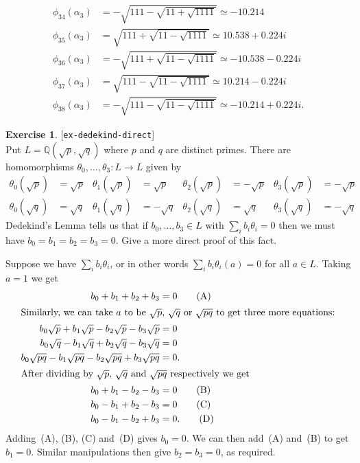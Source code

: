\documentclass{amsart}
\newcommand{\Q}         {{\mathbb{Q}}}
\newcommand{\al}        {\alpha}
\newcommand{\tht}       {\theta}
\renewcommand{\:}{\colon}
\newcommand{\lastexlabel}{}
\newcommand{\exlabel}[1]{
 \global\def\lastexlabel{#1}\label{#1}[\texttt{#1}]\ \\
}
\newcommand{\exlabel}[1]{
 \global\def\lastexlabel{#1}\label{#1}
}
\newenvironment{solution}{\SolutionInline}{\endSolutionInline}
\theoremstyle{definition}
\newtheorem{exercise}{Exercise}[section]
\renewenvironment{solution}{\SolutionAtEnd}{\endSolutionAtEnd}
\begin{document}
\begin{solution}
\begin{itemize}
\begin{align*}
    \phi_{34}(\al_3) &= -\sqrt{111-\sqrt{11+\sqrt{1111}}} \simeq -10.214 \\
    \phi_{35}(\al_3) &= \sqrt{111+\sqrt{11-\sqrt{1111}}} \simeq 10.538+0.224i \\
    \phi_{36}(\al_3) &= -\sqrt{111+\sqrt{11-\sqrt{1111}}} \simeq -10.538-0.224i \\
    \phi_{37}(\al_3) &= \sqrt{111-\sqrt{11-\sqrt{1111}}} \simeq 10.214-0.224i \\
    \phi_{38}(\al_3) &= -\sqrt{111-\sqrt{11-\sqrt{1111}}} \simeq -10.214+0.224i.
   \end{align*}
 \end{itemize}
\end{solution}

\begin{exercise}\exlabel{ex-dedekind-direct}
 Put $L=\Q(\sqrt{p},\sqrt{q})$ where $p$ and $q$ are distinct primes. 
 There are homomorphisms $\tht_0,\dotsc,\tht_3\:L\to L$ given by 
 \begin{align*}
  \tht_0(\sqrt{p}) &=  \sqrt{p} &
  \tht_1(\sqrt{p}) &=  \sqrt{p} &
  \tht_2(\sqrt{p}) &= -\sqrt{p} &
  \tht_3(\sqrt{p}) &= -\sqrt{p} \\
  \tht_0(\sqrt{q}) &=  \sqrt{q} &
  \tht_1(\sqrt{q}) &= -\sqrt{q} &
  \tht_2(\sqrt{q}) &=  \sqrt{q} &
  \tht_3(\sqrt{q}) &= -\sqrt{q}  
 \end{align*}
 Dedekind's Lemma tells us that if $b_0,\dotsc,b_3\in L$ with
 $\sum_ib_i\tht_i=0$ then we must have $b_0=b_1=b_2=b_3=0$.  Give a
 more direct proof of this fact.
\end{exercise}
\begin{solution}
 Suppose we have $\sum_ib_i\tht_i$, or in other words
 $\sum_ib_i\tht_i(a)=0$ for all $a\in L$.  Taking $a=1$ we get 
 \begin{align*}
  b_0+b_1+b_2+b_3 &= 0 \tag{A} \\
  \intertext{Similarly, we can take $a$ to be $\sqrt{p}$, $\sqrt{q}$
   or $\sqrt{pq}$ to get three more equations:}
  b_0\sqrt{p}+b_1\sqrt{p}-b_2\sqrt{p}-b_3\sqrt{p} &= 0 \\
  b_0\sqrt{q}-b_1\sqrt{q}+b_2\sqrt{q}-b_3\sqrt{q} &= 0 \\
  b_0\sqrt{pq}-b_1\sqrt{pq}-b_2\sqrt{pq}+b_3\sqrt{pq} &= 0. \\
  \intertext{After dividing by $\sqrt{p}$, $\sqrt{q}$ and $\sqrt{pq}$
   respectively we get}
  b_0+b_1-b_2-b_3 &= 0 \tag{B} \\
  b_0-b_1+b_2-b_3 &= 0 \tag{C} \\
  b_0-b_1-b_2+b_3 &= 0. \tag{D}
 \end{align*}
 Adding~(A), (B), (C) and~(D) gives $b_0=0$.  We can then add~(A)
 and~(B) to get $b_1=0$.  Similar manipulations then give $b_2=b_3=0$,
 as required.
\end{solution}
\end{document}
